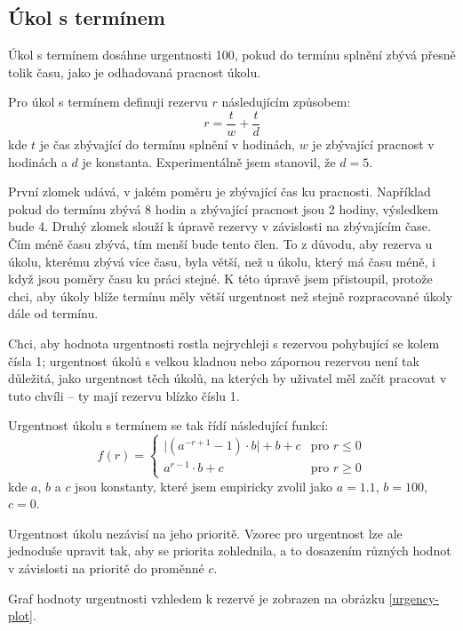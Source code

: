 \documentclass[thesis=B,czech]{FITthesis}[2012/06/26]
\begin{document}
		
		\subsection{Úkol s termínem}
			Úkol s termínem dosáhne urgentnosti 100, pokud do termínu splnění zbývá přesně tolik času, jako je odhadovaná pracnost úkolu.
		
			Pro úkol s termínem definuji rezervu $r$ následujícím způsobem:
			\begin{equation}
				r = \frac{t}{w} + \frac{t}{d}
			\end{equation}
			kde $t$ je čas zbývající do termínu splnění v hodinách, $w$ je zbývající pracnost v hodinách a $d$ je konstanta. Experimentálně jsem stanovil, že $d=5$. 
			
			První zlomek udává, v jakém poměru je zbývající čas ku pracnosti. Například pokud do termínu zbývá 8 hodin a zbývající pracnost jsou 2 hodiny, výsledkem bude 4. Druhý zlomek slouží k úpravě rezervy v závislosti na zbývajícím čase. Čím méně času zbývá, tím menší bude tento člen. To z důvodu, aby rezerva u úkolu, kterému zbývá více času, byla větší, než u úkolu, který má času méně, i když jsou poměry času ku práci stejné. 
			K této úpravě jsem přistoupil, protože chci, aby úkoly blíže termínu měly větší urgentnost než stejně rozpracované úkoly dále od termínu.
			
			Chci, aby hodnota urgentnosti rostla nejrychleji s rezervou pohybující se kolem čísla 1; urgentnost úkolů s velkou kladnou nebo zápornou rezervou není tak důležitá, jako urgentnost těch úkolů, na kterých by uživatel měl začít pracovat v tuto chvíli -- ty mají rezervu blízko číslu 1. 
			
			Urgentnost úkolu s termínem se tak řídí následující funkcí:
				\begin{equation}
				f(r)=
				\begin{cases}
					\lvert(a^{-r+1}-1)\cdot b \rvert +b+c& \text{pro } r\leq 0 \\
					a^{r-1}\cdot b + c& \text{pro } r\geq 0
				\end{cases}
				\end{equation}
			kde $a$, $b$ a $c$ jsou konstanty, které jsem empiricky zvolil jako $a=1.1$, $b=100$, $c=0$.

			Urgentnost úkolu nezávisí na jeho prioritě. Vzorec pro urgentnost lze ale jednoduše upravit tak, aby se priorita zohlednila, a to dosazením různých hodnot v závislosti na prioritě do proměnné $c$.
			
			Graf hodnoty urgentnosti vzhledem k rezervě je zobrazen na obrázku \ref{urgency-plot}.
			
\end{document}
